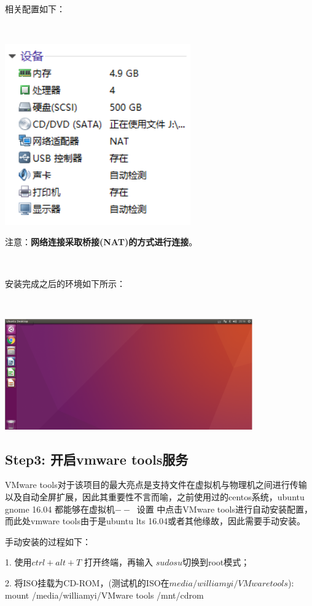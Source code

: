 \documentclass[UTF8, Microsoft YaHei]{book}
\begin{document}
    相关配置如下：

    ~

    \includegraphics[width=0.6\textwidth]{./img/虚拟机设备配置.png}

    注意：\textbf{网络连接采取桥接(NAT)的方式进行连接}。

    ~

    安装完成之后的环境如下所示：

    ~

    \includegraphics[width=0.8\textwidth]{./img/Ubuntu桌面图.png}

    \subsection{Step3: 开启vmware tools服务}
    VMware tools对于该项目的最大亮点是支持文件在虚拟机与物理机之间进行传输以及自动全屏扩展，因此其重要性不言而喻，之前使用过的centos系统，ubuntu gnome 16.04 都能够在虚拟机$--\>$ 设置 中点击VMware tools进行自动安装配置，而此处vmware tools由于是ubuntu lts 16.04或者其他缘故，因此需要手动安装。

    手动安装的过程如下：

    1. 使用$ctrl + alt + T$ 打开终端，再输入 $sudo su$切换到root模式；

    2. 将ISO挂载为CD-ROM，(测试机的ISO在$media/williamyi/VMware tools$): mount /media/williamyi/VMware tools /mnt/cdrom
\end{document}
